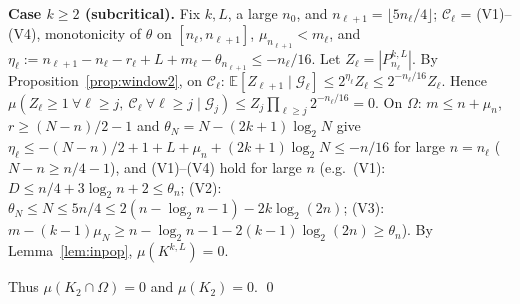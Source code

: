 \documentclass[11pt]{amsart}
\theoremstyle{definition}
\newcommand{\E}{\mathbb E}
\begin{document}
\medskip\noindent\textbf{Case $k\ge2$ (subcritical).} Fix $k,L$, a large $n_0$, and $n_{\ell+1}=\lfloor5n_\ell/4\rfloor$;
$\mathcal C_\ell$ = (V1)--(V4), monotonicity of $\theta$ on $[n_\ell,n_{\ell+1}]$, $\mu_{n_{\ell+1}}<m_\ell$, and
$\eta_\ell:=n_{\ell+1}-n_\ell-r_\ell+L+m_\ell-\theta_{n_{\ell+1}}\le-n_\ell/16$. Let $Z_\ell=|P^{k,L}_{n_\ell}|$. By
Proposition~\ref{prop:window2}, on $\mathcal C_\ell$: $\E[Z_{\ell+1}\mid\mathcal G_\ell]\le2^{\eta_\ell}Z_\ell\le2^{-n_\ell/16}Z_\ell$. Hence
$\mu(Z_\ell\ge1\ \forall\ell\ge j,\ \mathcal C_\ell\ \forall\ell\ge j\mid\mathcal G_j)\le Z_j\prod_{\ell\ge j}2^{-n_\ell/16}=0$.
On $\Omega$: $m\le n+\mu_n$, $r\ge(N-n)/2-1$ and $\theta_N=N-(2k+1)\log_2N$ give
$\eta_\ell\le-(N-n)/2+1+L+\mu_n+(2k+1)\log_2N\le-n/16$ for large $n=n_\ell$ ($N-n\ge n/4-1$), and (V1)--(V4) hold for large $n$
(e.g.\ (V1): $D\le n/4+3\log_2n+2\le\theta_n$; (V2): $\theta_N\le N\le 5n/4\le2(n-\log_2n-1)-2k\log_2(2n)$; (V3): $m-(k-1)\mu_N\ge n-\log_2n-1-2(k-1)\log_2(2n)\ge\theta_n$).
By Lemma~\ref{lem:inpop}, $\mu(K^{k,L})=0$.

\medskip
Thus $\mu(K_2\cap\Omega)=0$ and $\mu(K_2)=0$. \qed
\end{document}
